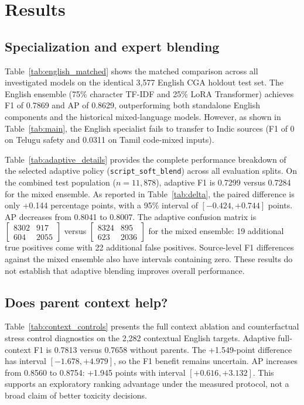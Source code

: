 \documentclass[11pt,a4paper]{article}
\begin{document}
\section{Results}


\subsection{Specialization and expert blending}
Table~\ref{tab:english_matched} shows the matched comparison across all investigated models on the identical 3,577 English CGA holdout test set. The English ensemble (75\% character TF-IDF and 25\% LoRA Transformer) achieves F1 of 0.7869 and AP of 0.8629, outperforming both standalone English components and the historical mixed-language models. However, as shown in Table~\ref{tab:main}, the English specialist fails to transfer to Indic sources (F1 of 0 on Telugu safety and 0.0311 on Tamil code-mixed inputs). 

Table~\ref{tab:adaptive_details} provides the complete performance breakdown of the selected adaptive policy (\texttt{script\_soft\_blend}) across all evaluation splits. On the combined test population ($n=11,878$), adaptive F1 is 0.7299 versus 0.7284 for the mixed ensemble. As reported in Table~\ref{tab:delta}, the paired difference is only +0.144 percentage points, with a 95\% interval of $[-0.424,+0.744]$ points. AP decreases from 0.8041 to 0.8007. The adaptive confusion matrix is $\left[\begin{smallmatrix}8302&917\\604&2055\end{smallmatrix}\right]$ versus $\left[\begin{smallmatrix}8324&895\\623&2036\end{smallmatrix}\right]$ for the mixed ensemble: 19 additional true positives come with 22 additional false positives. Source-level F1 differences against the mixed ensemble also have intervals containing zero. These results do not establish that adaptive blending improves overall performance.

\subsection{Does parent context help?}
Table~\ref{tab:context_controls} presents the full context ablation and counterfactual stress control diagnostics on the 2,282 contextual English targets. Adaptive full-context F1 is 0.7813 versus 0.7658 without parents. The +1.549-point difference has interval $[-1.678,+4.979]$, so the F1 benefit remains uncertain. AP increases from 0.8560 to 0.8754: +1.945 points with interval $[+0.616,+3.132]$. This supports an exploratory ranking advantage under the measured protocol, not a broad claim of better toxicity decisions.
\end{document}
